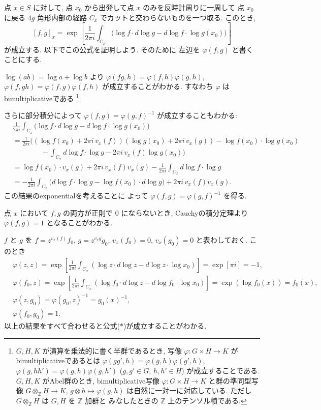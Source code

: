 \documentclass[12pt,twoside]{jarticle}
\newcommand\Z{{\mathbb Z}} %
\theoremstyle{definition} %
\theoremstyle{definition} %
\theoremstyle{definition} %
\numberwithin{theorem}{section}
\numberwithin{equation}{section}
\numberwithin{figure}{section}
\numberwithin{table}{section}
\newcommand\tame[3]{\left[#2,#3\right]_{#1}}
\begin{document}
点 $x\in S$ に対して, 
点 $x_0$ から出発して点 $x$ のみを反時計周りに一周して
点 $x_0$ に戻る $4g$ 角形内部の経路 $C_x$ でカットと交わらないものを一つ取る.
このとき, 
\[
\tame{x}{f}{g} =
\exp\left[
\frac{1}{2\pi i}\int_{C_x} \bigl(
  \log f\cdot d\log g - d\log f\cdot\log g(x_0)
\bigr)
\right]
\tag{$*$}
\]
が成立する. 以下でこの公式を証明しよう. 
そのために 左辺を $\varphi(f,g)$ と書くことにする.

$\log(ab)=\log a+\log b$ より
$\varphi(fg,h)=\varphi(f,h)\varphi(g,h)$, 
$\varphi(f,gh)=\varphi(f,g)\varphi(f,h)$ が成立することがわかる.
すなわち $\varphi$ はbimultiplicativeである%
\footnote{$G,H,K$ が演算を乗法的に書く半群であるとき, 
写像 $\varphi:G\times H\to K$ がbimultiplicativeであるとは
$\varphi(gg',h)=\varphi(g,h)\varphi(g',h)$,
$\varphi(g,hh')=\varphi(g,h)\varphi(g,h')$
($g,g'\in G$, $h,h'\in H$)
が成立することである.
$G,H,K$ がAbel群のとき, bimultiplicative写像 $\varphi:G\times H\to K$
と群の準同型写像 $G\otimes_\Z H\to K$, $g\otimes h\mapsto\varphi(g,h)$
は自然に一対一に対応している. ただし $G\otimes_\Z H$ は $G,H$ を $\Z$ 加群と
みなしたときの $\Z$ 上のテンソル積である.
}.

さらに部分積分によって $\varphi(f,g)=\varphi(g,f)^{-1}$ が成立することもわかる:
\begin{align*}
&
\frac{1}{2\pi i}\int_{C_x} \bigl(
  \log f\cdot d\log g - d\log f\cdot\log g(x_0)
\bigr)
\\ &
=\frac{1}{2\pi i}\bigl(
   (\log f(x_0)+2\pi i\,v_x(f))(\log g(x_0)+2\pi i\,v_x(g))
  - \log f(x_0)\cdot\log g(x_0)
\\ & \qquad\qquad
  - \int_{C_x} d\log f\cdot\log g
  - 2\pi i\,v_x(f)\log g(x_0)
\bigr)
\\ &
= \log f(x_0)\cdot v_x(g) + 2\pi i\,v_x(f)v_x(g) 
- \frac{1}{2\pi i}\int_{C_x}d\log f\cdot\log g
\\ &
=
-
\frac{1}{2\pi i}\int_{C_x} \bigl(
  d\log f\cdot \log g - \log f(x_0)\cdot d\log g
\bigr)
+ 2\pi i\,v_x(f)v_x(g).
\end{align*}
この結果のexponentialを考えることに
よって $\varphi(f,g)=\varphi(g,f)^{-1}$ を得る.

点 $x$ において $f,g$ の両方が正則で $0$ にならないとき, 
Cauchyの積分定理より $\varphi(f,g)=1$ となることがわかる.

$f$ と $g$ を $f=z^{v_x(f)}f_0$, $g=z^{v_x{g}}g_0$,
$v_x(f_0)=0$, $v_x(g_0)=0$ と表わしておく.
このとき
\begin{align*}
&
\varphi(z,z)
=\exp\left[
  \frac{1}{2\pi i}\int_{C_x}(\log z\cdot d\log z-d\log z\cdot\log x_0)
\right]
=\exp[\pi i]= -1,
\\ &
\varphi(f_0,z)
=\exp\left[
  \frac{1}{2\pi i}\int_{C_x}(\log f_0\cdot d\log z-d\log f_0\cdot\log x_0)
\right]
= \exp(\log f_0(x))=f_0(x),
\\ &
\varphi(z,g_0)=\varphi(g_0,z)^{-1}=g_0(x)^{-1},
\\ &
\varphi(f_0,g_0)=1.
\end{align*}
以上の結果をすべて合わせると公式($*$)が成立することがわかる.
\end{document}
